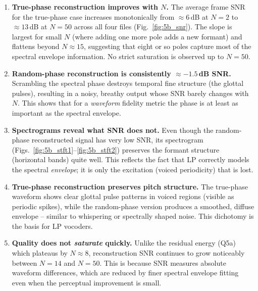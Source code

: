 \documentclass[12pt,a4paper,onecolumn]{exam}
\begin{document}
\begin{enumerate}
  \item \textbf{True-phase reconstruction improves with $N$.}
        The average frame SNR for the true-phase case increases
        monotonically from $\approx6$\,dB at $N=2$ to
        $\approx13$\,dB at $N=50$ across all four files
        (Fig.~\ref{fig:5b_snr}).
        The slope is largest for small $N$ (where adding one more pole
        adds a new formant) and flattens beyond $N\approx15$, suggesting
        that eight or so poles capture most of the spectral envelope
        information. No strict saturation is observed up to $N=50$.

  \item \textbf{Random-phase reconstruction is consistently $\approx-1.5$\,dB SNR.}
        Scrambling the spectral phase destroys temporal fine structure
        (the glottal pulses), resulting in a noisy, breathy output whose
        SNR barely changes with $N$.  This shows that for a \emph{waveform}
        fidelity metric the phase is at least as important as the spectral
        envelope.

  \item \textbf{Spectrograms reveal what SNR does not.}
        Even though the random-phase reconstructed signal has very low SNR,
        its spectrogram (Figs.~\ref{fig:5b_stft1}--\ref{fig:5b_stft2})
        preserves the formant structure (horizontal bands) quite well.
        This reflects the fact that LP correctly models the spectral
        \emph{envelope}; it is only the excitation (voiced periodicity)
        that is lost.

  \item \textbf{True-phase reconstruction preserves pitch structure.}
        The true-phase waveform shows clear glottal pulse patterns in
        voiced regions (visible as periodic spikes), while the random-phase
        version produces a smoothed, diffuse envelope -- similar to
        whispering or spectrally shaped noise. This dichotomy is the
        basis for LP vocoders.

  \item \textbf{Quality does not \emph{saturate} quickly.}
        Unlike the residual energy (Q5a) which plateaus by $N\approx8$,
        reconstruction SNR continues to grow noticeably between
        $N=14$ and $N=50$. This is because SNR measures absolute
        waveform differences, which are reduced by finer spectral
        envelope fitting even when the perceptual improvement is small.
\end{enumerate}
\end{document}
